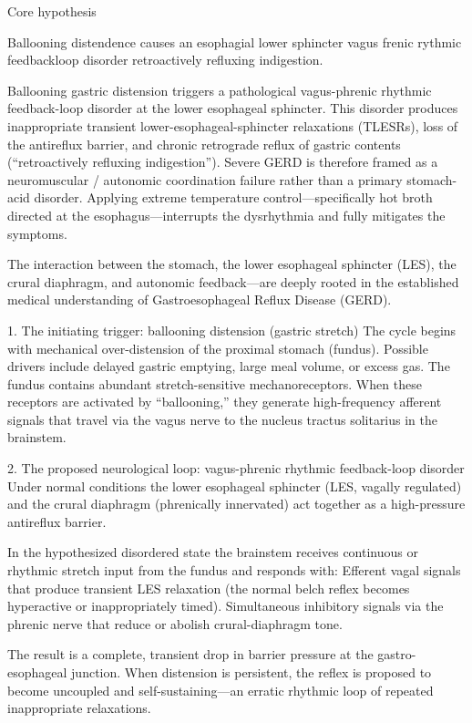 Core hypothesis 

Ballooning distendence causes an esophagial lower sphincter vagus frenic rythmic feedbackloop disorder retroactively refluxing indigestion.

Ballooning gastric distension triggers a pathological vagus-phrenic rhythmic feedback-loop disorder at the lower esophageal sphincter. This disorder produces inappropriate transient lower-esophageal-sphincter relaxations (TLESRs), loss of the antireflux barrier, and chronic retrograde reflux of gastric contents (“retroactively refluxing indigestion”). Severe GERD is therefore framed as a neuromuscular / autonomic coordination failure rather than a primary stomach-acid disorder. Applying extreme temperature control—specifically hot broth directed at the esophagus—interrupts the dysrhythmia and fully mitigates the symptoms.

The interaction between the stomach, the lower esophageal sphincter (LES), the crural diaphragm, and autonomic feedback—are deeply rooted in the established medical understanding of Gastroesophageal Reflux Disease (GERD).

1. The initiating trigger: ballooning distension (gastric stretch)
The cycle begins with mechanical over-distension of the proximal stomach (fundus).  
Possible drivers include delayed gastric emptying, large meal volume, or excess gas.  
The fundus contains abundant stretch-sensitive mechanoreceptors. When these receptors are activated by “ballooning,” they generate high-frequency afferent signals that travel via the vagus nerve to the nucleus tractus solitarius in the brainstem.

2. The proposed neurological loop: vagus-phrenic rhythmic feedback-loop disorder
Under normal conditions the lower esophageal sphincter (LES, vagally regulated) and the crural diaphragm (phrenically innervated) act together as a high-pressure antireflux barrier.  

In the hypothesized disordered state the brainstem receives continuous or rhythmic stretch input from the fundus and responds with:  
Efferent vagal signals that produce transient LES relaxation (the normal belch reflex becomes hyperactive or inappropriately timed).  
Simultaneous inhibitory signals via the phrenic nerve that reduce or abolish crural-diaphragm tone.  

The result is a complete, transient drop in barrier pressure at the gastro-esophageal junction. When distension is persistent, the reflex is proposed to become uncoupled and self-sustaining—an erratic rhythmic loop of repeated inappropriate relaxations.

